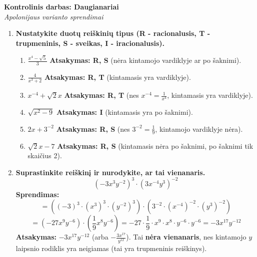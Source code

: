 \documentclass[11pt,a4paper]{article}
\begin{document}
\begin{center}
    \Large \textbf{Kontrolinis darbas: Daugianariai} \\
    \large \textit{Apolonijaus varianto sprendimai}
\end{center}
\vspace{0.5cm}

\begin{enumerate}[label=\textbf{\arabic*.}]
    \item \textbf{Nustatykite duotų reiškinių tipus (R - racionalusis, T - trupmeninis, S - sveikas, I - iracionalusis).}
    \begin{enumerate}[label=\alph*)]
        \item $\displaystyle \frac{x^4 - \sqrt{5}}{3}$ \quad \textbf{Atsakymas: R, S} (nėra kintamojo vardiklyje ar po šaknimi).
        \item $\displaystyle \frac{4}{x^3 + 2}$ \quad \textbf{Atsakymas: R, T} (kintamasis yra vardiklyje).
        \item $\displaystyle x^{-4} + \sqrt{2} x$ \quad \textbf{Atsakymas: R, T} (nes $x^{-4} = \frac{1}{x^4}$, kintamasis yra vardiklyje).
        \item $\displaystyle \sqrt{x^2 - 9}$ \quad \textbf{Atsakymas: I} (kintamasis yra po šaknimi).
        \item $\displaystyle 2x+3^{-2} $ \quad \textbf{Atsakymas: R, S} (nes $3^{-2} = \frac{1}{9}$, kintamojo vardiklyje nėra).
        \item $\displaystyle \sqrt{2}x-7 $ \quad \textbf{Atsakymas: R, S} (kintamasis nėra po šaknimi, po šaknimi tik skaičius 2).
    \end{enumerate}

    \vspace{0.5cm}
    \item \textbf{Suprastinkite reiškinį ir nurodykite, ar tai vienanaris.}
    \[ \left( -3x^3y^{-2} \right)^3 \cdot \left( 3x^{-4}y^3 \right)^{-2} \]
    \textbf{Sprendimas:}
    \[ = \left( (-3)^3 \cdot (x^3)^3 \cdot (y^{-2})^3 \right) \cdot \left( 3^{-2} \cdot (x^{-4})^{-2} \cdot (y^3)^{-2} \right) \]
    \[ = \left( -27x^9y^{-6} \right) \cdot \left( \frac{1}{9}x^8y^{-6} \right) = -27 \cdot \frac{1}{9} \cdot x^9 \cdot x^8 \cdot y^{-6} \cdot y^{-6} = -3x^{17}y^{-12} \]
    \textbf{Atsakymas:} $-3x^{17}y^{-12}$ (arba $\displaystyle -\frac{3x^{17}}{y^{12}}$). Tai \textbf{nėra vienanaris}, nes kintamojo $y$ laipsnio rodiklis yra neigiamas (tai yra trupmeninis reiškinys).


\end{enumerate}
\end{document}
